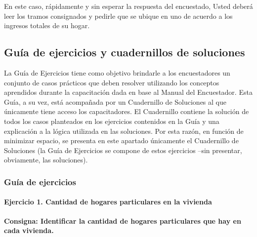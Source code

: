 \documentclass[
  openany]{book}
\begin{document}
En este caso, rápidamente y sin esperar la respuesta del encuestado, Usted deberá leer los tramos consignados y pedirle que se ubique en uno de acuerdo a los ingresos totales de su hogar.

\hypertarget{guuxeda-de-ejercicios-y-cuadernillos-de-soluciones}{%
\subsection{Guía de ejercicios y cuadernillos de soluciones}\label{guuxeda-de-ejercicios-y-cuadernillos-de-soluciones}}

La Guía de Ejercicios tiene como objetivo brindarle a los encuestadores un conjunto de casos prácticos que deben resolver utilizando los conceptos aprendidos durante la capacitación dada en base al Manual del Encuestador. Esta Guía, a su vez, está acompañada por un Cuadernillo de Soluciones al que únicamente tiene acceso los capacitadores. El Cuadernillo contiene la solución de todos los casos planteados en los ejercicios contenidos en la Guía y una explicación a la lógica utilizada en las soluciones. Por esta razón, en función de minimizar espacio, se presenta en este apartado únicamente el Cuadernillo de Soluciones (la Guía de Ejercicios se compone de estos ejercicios --sin presentar, obviamente, las soluciones).

\hypertarget{guuxeda-de-ejercicios}{%
\subsubsection{Guía de ejercicios}\label{guuxeda-de-ejercicios}}

\hypertarget{ejercicio-1.-cantidad-de-hogares-particulares-en-la-vivienda}{%
\paragraph{Ejercicio 1. Cantidad de hogares particulares en la vivienda}\label{ejercicio-1.-cantidad-de-hogares-particulares-en-la-vivienda}}

\textbf{Consigna: Identificar la cantidad de hogares particulares que hay en cada vivienda.}
\end{document}
